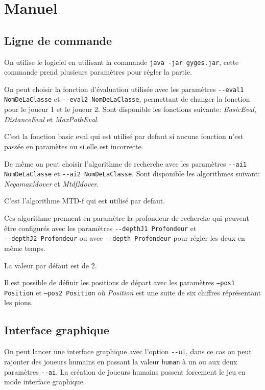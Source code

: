 \chapter{Manuel}

	\section{Ligne de commande}
	
		On utilise le logiciel en utilisant la commande
		\texttt{java -jar gyges.jar}, cette commande prend
		plusieurs paramètres pour régler la partie.
		
		\vspace{1em}
		On peut choisir la fonction d'évaluation utilisée avec les
		paramètres \texttt{-{}-eval1 NomDeLaClasse} et \texttt{-{}-eval2 NomDeLaClasse},
		permettant de changer la fonction pour le joueur 1 et le joueur 2.
		Sont disponible les fonctions suivante: \emph{BasicEval}, \emph{DistanceEval} et
		\emph{MaxPathEval}.
		
		C'est la fonction basic eval qui est utilisé par defaut si aucune fonction
		n'est passée en paramètes ou si elle est incorrecte.
		
		\vspace{1em}
		De même on peut choisir l'algorithme de recherche avec les paramètres \texttt{-{}-ai1 NomDeLaClasse}
		et \texttt{-{}-ai2 NomDeLaClasse}.
		Sont disponible les algorithmes suivant: \emph{NegamaxMover} et \emph{MtdfMover}.
		
		C'est l'algorithme MTD-f qui est utilisé par defaut.
		
		\vspace{1em}
		Ces algorithme prennent en paramètre la profondeur de recherche qui peuvent
		être configurés avec les paramètres \texttt{-{}-depthJ1 Profondeur} et\\
		\texttt{-{}-depthJ2 Profondeur} ou avec \texttt{-{}-depth Profondeur} pour régler les deux
		en même temps.
		
		La valeur par défaut est de 2.
		
		\vspace{1em}
		Il est possible de définir les positions de départ avec les paramètres
		\texttt{--pos1 Position} et \texttt{--pos2 Position} où \emph{Position}
		est une suite de six chiffres réprésentant les pions.
		
	\section{Interface graphique}
		On peut lancer une interface graphique avec l'option \texttt{-{}-ui}, dans ce cas
		on peut rajouter des joueurs humains en passant la valeur \texttt{human} à un ou
		aux deux paramètres \texttt{-{}-ai}.
		La création de joueurs humains passent forcement le jeu en mode interface graphique.
		
